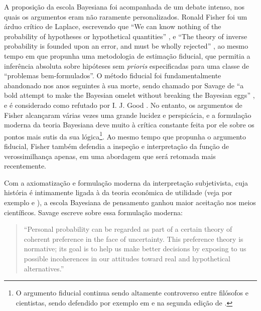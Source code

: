 A proposição da escola Bayesiana foi acompanhada de um debate intenso, nos quais os argumentos eram não raramente personalizados.
Ronald Fisher foi um árduo crítico
de Laplace, escrevendo que ``We can know nothing of the probability of hypotheses or hypothetical quantities'' \citep{Fisher1921},
e ``The theory of inverse probability is founded upon an error, and must be wholly rejected'' \citep{Fisher1925}, ao mesmo tempo
em que propunha uma metodologia de estimação fiducial, 
que permitia a inferência absoluta sobre hipóteses sem {\em prioris} 
especificadas para uma classe de ``problemas bem-formulados''. O método fiducial foi fundamentalmente abandonado nos anos 
seguintes à sua morte, sendo chamado por Savage de ``a bold attempt to make the Bayesian omelet without
breaking the Bayesian eggs'' \citep{Savage60}, e é considerado como refutado por 
I. J. Good \citep{Good92}. No entanto, os argumentos de Fisher
alcançaram várias vezes uma grande lucidez e perspicácia, e a formulação moderna da teoria Bayesiana 
deve muito à crítica constante feita por ele sobre os pontos mais sutis da sua lógica\footnote{
O argumento fiducial continua sendo altamente controverso entre filósofos e cientistas, sendo defendido por exemplo
em \citep{Hacking65} e na segunda edição de \citep{Edwards72}.}. Ao mesmo tempo que propunha o argumento fiducial,
Fisher também defendia a inspeção e interpretação da função de verossimilhança apenas, em uma abordagem que será
retomada mais recentemente.

Com a axiomatização e formulação moderna da interpretação subjetivista, cuja história é intimamente ligada à da teoria
econômica de utilidade (veja por exemplo \citep{Friedman48} e \citep{Pfanzagl67}),
a escola Bayesiana de pensamento ganhou maior aceitação nos meios científicos. 
Savage escreve sobre essa formulação moderna:

\begin{quote}
``Personal probability can be regarded as part of a certain theory of coherent preference in the face of uncertainty. This
preference theory is normative; its goal is to help us make better decisions by exposing to us possible incoherences in our
attitudes toward real and hypothetical alternatives.'' \citep{Savage67}
\end{quote}

